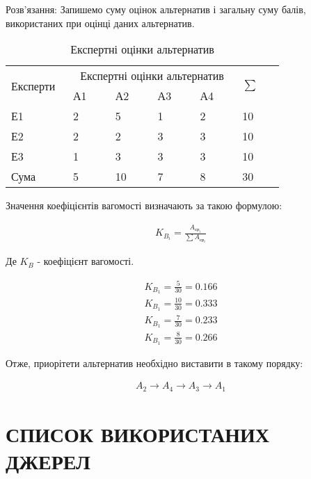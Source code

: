 \documentclass[oneside,14pt]{extarticle}
\begin{document}
	Розв'язання:
	Запишемо суму оцінок альтернатив і загальну суму балів, використаних при оцінці даних альтернатив.

	\begin{table}[H]
		\centering
		\caption{Експертні оцінки альтернатив}
		\begin{tabular}{|p{0.13\linewidth}|p{0.13\linewidth}|p{0.13\linewidth}|p{0.13\linewidth}|p{0.13\linewidth}|p{0.13\linewidth}|}
			\hline
			\multirow{2}{*}{Експерти} & \multicolumn{4}{c|}{Експертні оцінки альтернатив} & \multirow{2}{*}{$\sum$} \\
			\cline{2-5}
			& А1 & А2 & А3 & А4 & \\
			\hline
			Е1 & 2 & 5 & 1 & 2 & 10 \\
			\hline
			Е2 & 2 & 2 & 3 & 3 & 10 \\
			\hline
			Е3 & 1 & 3 & 3 & 3 & 10 \\
			\hline
			Сума & 5 & 10 & 7 & 8 & 30 \\
			\hline
		\end{tabular}
	\end{table}
	
	Значення коефіцієнтів вагомості визначають за такою формулою:
	
	\begin{gather}
		K_{B_i}=\frac{A_{\text{ср}_i}}{\sum A_{\text{ср}_i}}
	\end{gather}
	
	Де $K_B$ - коефіцієнт вагомості.
	
	\begin{gather}
		K_{B_1}=\frac{5}{30}=0.166\nonumber\\
		K_{B_1}=\frac{10}{30}=0.333\nonumber\\
		K_{B_1}=\frac{7}{30}=0.233\nonumber\\
		K_{B_1}=\frac{8}{30}=0.266\nonumber
	\end{gather}
	
	Отже, приорітети альтернатив необхідно виставити в такому порядку: 
	
	\begin{gather}
		A_2\rightarrow A_4\rightarrow A_3\rightarrow A_1	\nonumber
	\end{gather}

\newpage
\section*{СПИСОК ВИКОРИСТАНИХ ДЖЕРЕЛ}
\end{document}
